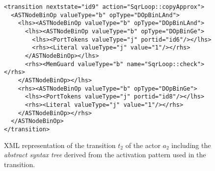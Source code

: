 \begin{figure}[h]
\begin{verbatim}
<transition nextstate="id9" action="SqrLoop::copyApprox">
  <ASTNodeBinOp valueType="b" opType="DOpBinLAnd">
    <lhs><ASTNodeBinOp valueType="b" opType="DOpBinLAnd">
      <lhs><ASTNodeBinOp valueType="b" opType="DOpBinGe">
        <lhs><PortTokens valueType="j" portid="id6"/></lhs>
        <rhs><Literal valueType="j" value="1"/></rhs>
      </ASTNodeBinOp></lhs>
      <rhs><MemGuard valueType="b" name="SqrLoop::check"></rhs>
    </ASTNodeBinOp></lhs>
    <rhs><ASTNodeBinOp valueType="b" opType="DOpBinGe">
      <lhs><PortTokens valueType="j" portid="id8"/></lhs>
      <rhs><Literal valueType="j" value="1"/></rhs>
    </ASTNodeBinOp></rhs>
  </ASTNodeBinOp>
</transition>
\end{verbatim}
\caption{\label{fig:xml-t2-sqrloop}%
XML representation of the transition $t_2$ of the  actor $a_2$ including the \emph{abstract syntax tree} derived from the activation pattern used in the transition.
}
\end{figure}




